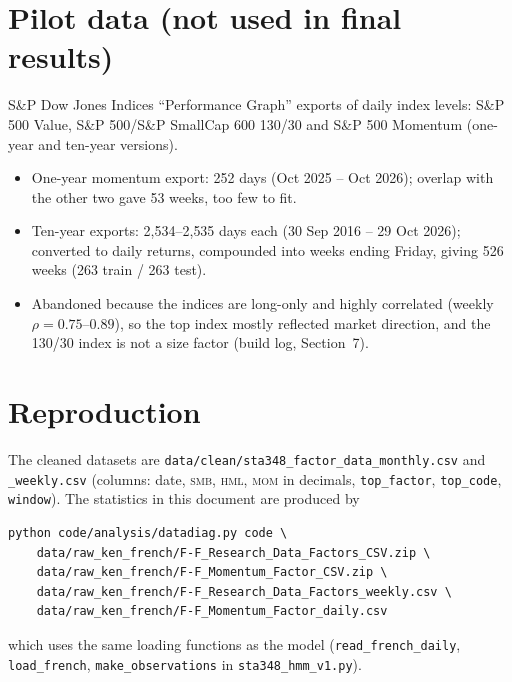 \documentclass[11pt]{article}
\newcommand{\SMB}{\textsc{smb}}
\newcommand{\HML}{\textsc{hml}}
\newcommand{\MOM}{\textsc{mom}}
\begin{document}
\section{Pilot data (not used in final results)}
S\&P Dow Jones Indices ``Performance Graph'' exports of daily index levels: S\&P 500 Value, S\&P 500/S\&P SmallCap 600 130/30 and S\&P 500 Momentum (one-year and ten-year versions).
\begin{itemize}
\item One-year momentum export: 252 days (Oct 2025 -- Oct 2026); overlap with the other two gave 53 weeks, too few to fit.
\item Ten-year exports: 2{,}534--2{,}535 days each (30 Sep 2016 -- 29 Oct 2026); converted to daily returns, compounded into weeks ending Friday, giving 526 weeks (263 train / 263 test).
\item Abandoned because the indices are long-only and highly correlated (weekly $\rho=0.75$--$0.89$), so the top index mostly reflected market direction, and the 130/30 index is not a size factor (build log, Section~7).
\end{itemize}

\appendix
\section{Reproduction}
\sloppy
The cleaned datasets are \texttt{data/clean/sta348\_factor\_data\_monthly.csv} and \texttt{\_weekly.csv} (columns: date, \SMB, \HML, \MOM{} in decimals, \texttt{top\_factor}, \texttt{top\_code}, \texttt{window}). The statistics in this document are produced by
\begin{verbatim}
python code/analysis/datadiag.py code \
    data/raw_ken_french/F-F_Research_Data_Factors_CSV.zip \
    data/raw_ken_french/F-F_Momentum_Factor_CSV.zip \
    data/raw_ken_french/F-F_Research_Data_Factors_weekly.csv \
    data/raw_ken_french/F-F_Momentum_Factor_daily.csv
\end{verbatim}
which uses the same loading functions as the model (\texttt{read\_french\_daily}, \texttt{load\_french}, \texttt{make\_observations} in \texttt{sta348\_hmm\_v1.py}).
\end{document}
